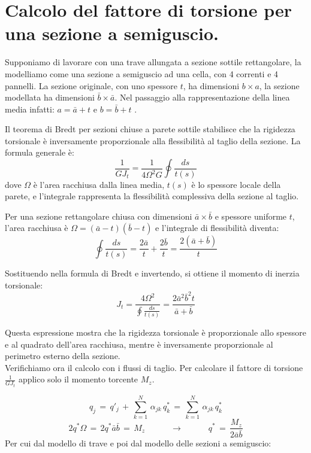 \section{Calcolo del fattore di torsione per una sezione a semiguscio.}

Supponiamo di lavorare con una trave allungata a sezione sottile rettangolare, la modelliamo come una sezione a semiguscio ad una cella, con 4 correnti e 4 pannelli. La sezione originale, con uno spessore $t$, ha dimensioni $b\times a$, la sezione modellata ha dimensioni $\bar{b}\times\bar{a}$. Nel passaggio alla rappresentazione della linea media infatti: $a = \bar{a}+t$ e $b = \bar{b}+t$ .

Il teorema di Bredt per sezioni chiuse a parete sottile stabilisce che la rigidezza torsionale è inversamente proporzionale alla flessibilità al taglio della sezione. La formula generale è:
\begin{equation*}
    \frac{1}{GJ_t} = \frac{1}{4\Omega^2 G} \oint \frac{ds}{t(s)}
\end{equation*}
dove $\Omega$ è l'area racchiusa dalla linea media, $t(s)$ è lo spessore locale della parete, e l'integrale rappresenta la flessibilità complessiva della sezione al taglio.

Per una sezione rettangolare chiusa con dimensioni $\bar{a} \times \bar{b}$ e spessore uniforme $t$, l'area racchiusa è $\Omega = (\bar{a}-t)(\bar{b}-t)$ e l'integrale di flessibilità diventa:
\begin{equation*}
    \oint \frac{ds}{t(s)} = \frac{2\bar{a}}{t} + \frac{2\bar{b}}{t} = \frac{2(\bar{a} + \bar{b})}{t}
\end{equation*}

Sostituendo nella formula di Bredt e invertendo, si ottiene il momento di inerzia torsionale:
\begin{equation*}
    J_t = \frac{4\Omega^2}{\oint \frac{ds}{t(s)}}  = \frac{2\bar{a}^2 \bar{b}^2t}{\bar{a} +\bar{b}}
\end{equation*}

Questa espressione mostra che la rigidezza torsionale è proporzionale allo spessore e al quadrato dell'area racchiusa, mentre è inversamente proporzionale al perimetro esterno della sezione.\\
Verifichiamo ora il calcolo con i flussi di taglio. Per calcolare il fattore di torsione $\frac{1}{GJ_t}$ applico solo il momento torcente $M_z$.

\begin{equation*}
    q_j\,=\,q'_j\,+\,   \sum^N_{k=1}\,\alpha_{jk}\,q^*_k\,=\,   \sum^N_{k=1}\,\alpha_{jk}\,q^*_k
\end{equation*}
\begin{equation*}
    2q^*\Omega \,=\,  2q^*\bar{a} \bar{b}\,=\, M_z\quad\quad\quad\rightarrow\quad\quad\quad q^*\,=\,\frac{M_z}{2\bar{a} \bar{b}}
\end{equation*}
Per cui dal modello di trave e poi dal modello delle sezioni a semiguscio:

